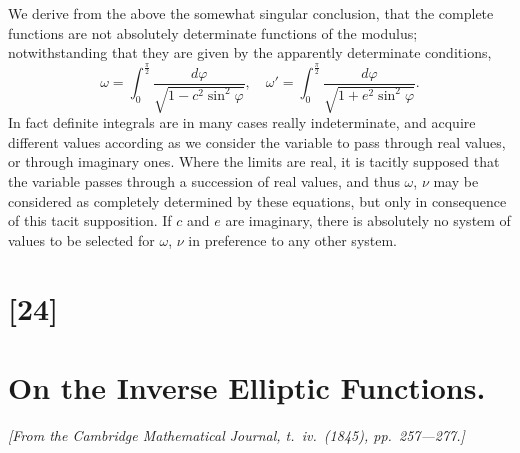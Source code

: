 \documentclass[11pt,a4paper]{book}
\begin{document}
We derive from the above the somewhat singular conclusion, that the complete
functions are not absolutely determinate functions of the modulus; notwithstanding
that they are given by the apparently determinate conditions,
\[
\omega = \int_0^{\frac{\pi}{2}} \frac{d\varphi}{\sqrt{1 - c^2 \sin^2 \varphi}},\quad
\omega' = \int_0^{\frac{\pi}{2}} \frac{d\varphi}{\sqrt{1 + e^2 \sin^2 \varphi}}.
\]
In fact definite integrals are in many cases really indeterminate, and acquire
different values according as we consider the variable to pass through real values, or
through imaginary ones. Where the limits are real, it is tacitly supposed that the
variable passes through a succession of real values, and thus $\omega$, $\nu$ may be considered
as completely determined by these equations, but only in consequence of this tacit
supposition. If $c$ and $e$ are imaginary, there is absolutely no system of values to be
selected for $\omega$, $\nu$ in preference to any other system.

\newpage
\section*{[24]}
\section*{On the Inverse Elliptic Functions.}

\textit{[From the Cambridge Mathematical Journal, t.~iv.~(1845), pp.~257---277.]}

\bigskip
\setcounter{page}{136}
\end{document}
